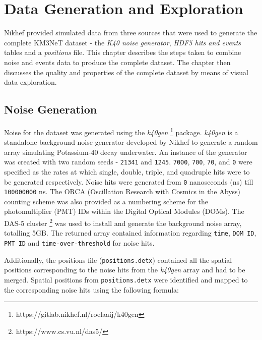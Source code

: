 \chapter{Data Generation and Exploration}
\label{sec:exploration}
\ifpdf
    \graphicspath{{4_data_exploration/figures/PNG/}{4_data_exploration/figures/PDF/}{4_data_exploration/figures/}}
\else
    \graphicspath{{4_data_exploration/figures/EPS/}{4_data_exploration/figures/}}
\fi


Nikhef provided simulated data from three sources that were used to generate the complete KM3NeT dataset - the \textit{K40 noise generator}, \textit{HDF5 hits and events} tables and a \textit{positions} file. This chapter describes the steps taken to combine noise and events data to produce the complete dataset. The chapter then discusses the quality and properties of the complete dataset by means of visual data exploration. 

\section{Noise Generation}
Noise for the dataset was generated using the \textit{k40gen} \footnote{https://gitlab.nikhef.nl/roelaaij/k40gen} package. \textit{k40gen} is a standalone background noise generator developed by Nikhef to generate a random array simulating Potassium-40 decay underwater. An instance of the generator was created with two random seeds - \texttt{21341} and \texttt{1245}. \texttt{7000}, \texttt{700}, \texttt{70}, and \texttt{0} were specified as the rates at which single, double, triple, and quadruple hits were to be generated respectively. Noise hits were generated from \texttt{0} nanoseconds (ns) till \texttt{100000000} ns. The ORCA (Oscillation Research with Cosmics in the Abyss) counting scheme was also provided as a numbering scheme for the photomultiplier (PMT) IDs within the Digital Optical Modules (DOMs). The DAS-5 cluster \footnote{https://www.cs.vu.nl/das5/} was used to install and generate the background noise array, totalling 5GB. The returned array contained information regarding \texttt{time}, \texttt{DOM ID}, \texttt{PMT ID} and \texttt{time-over-threshold} for noise hits.

Additionally, the positions file (\texttt{positions.detx}) contained all the spatial positions corresponding to the noise hits from the \textit{k40gen} array and had to be merged. Spatial positions from \texttt{positions.detx} were identified and mapped to the corresponding noise hits using the following formula:

